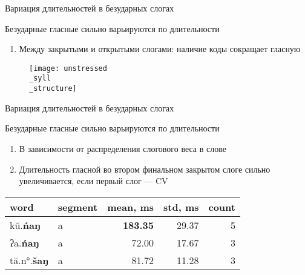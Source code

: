 \documentclass[10 pt, handout]{beamer}
\begin{document}
\begin{frame}{Вариация длительностей в безударных слогах}

	Безударные гласные сильно варьируются по длительности
	\vspace*{1em}

	\begin{enumerate}[\ding{102}]
		\item Между закрытыми и открытыми слогами: наличие коды сокращает гласную
	\end{enumerate}
	
	\begin{figure}[H]
		\texttt{[image: unstressed\\\_syll\\\_structure]}
	\end{figure}

\end{frame}

\begin{frame}{Вариация длительностей в безударных слогах}

	Безударные гласные сильно варьируются по длительности
	\vspace*{1em}

	\begin{enumerate}[\ding{94}]
		\item В зависимости от распределения слогового веса в слове
		\item Длительность гласной во втором финальном закрытом слоге сильно увеличивается, если первый слог --- CV
	\end{enumerate}
	
\begin{table}[H]
\centering
\begin{tabular}{llrrr}
\toprule
 {word} & {segment} &  {mean, ms} &  {std, ms} &  {count}  \\
\midrule
kŭ.\textbf{ńaŋ} &       a &    \textbf{183.35} &    29.37 &      5  \\
ʔa.\textbf{ńaŋ} &       a &     72.00 &    17.67 &      3  \\
tă.n°.\textbf{šaŋ} &       a &     81.72 &    11.28 &      3  \\
\bottomrule
\end{tabular}
\end{table}
	
\end{frame}
\end{document}
